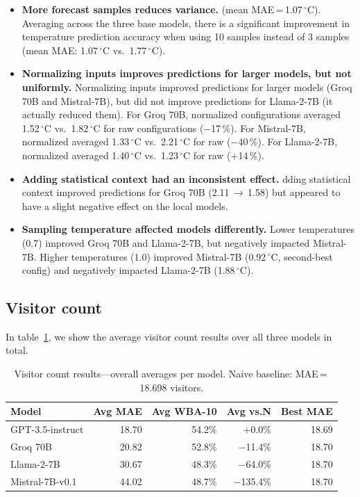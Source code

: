 \documentclass[11pt,a4paper]{article}
\begin{document}
\begin{itemize}[leftmargin=*]
\item \textbf{More forecast samples reduces variance.} (mean MAE\,=\,1.07\,$^{\circ}$C). Averaging across the three base models, there is a significant improvement in temperature prediction accuracy when using 10 samples instead of 3 samples (mean MAE: 1.07\,$^{\circ}$C vs.\ 1.77\,$^{\circ}$C).

\item \textbf{Normalizing inputs improves predictions for larger models, but not uniformly.} Normalizing inputs improved predictions for larger models (Groq 70B and Mistral-7B), but did not improve predictions for Llama-2-7B (it actually reduced them). 
  For Groq 70B, normalized configurations averaged 1.52\,$^{\circ}$C vs.\ 1.82\,$^{\circ}$C for raw configurations ($-$17\,\%).
  For Mistral-7B, normalized averaged 1.33\,$^{\circ}$C vs.\ 2.21\,$^{\circ}$C for raw ($-$40\,\%).
  For Llama-2-7B, normalized averaged 1.40\,$^{\circ}$C vs.\ 1.23\,$^{\circ}$C for raw ($+$14\,\%).  
  
\item \textbf{Adding statistical context had an inconsistent effect.}
  dding statistical context improved predictions for Groq 70B (2.11\,$\to$\,1.58) but appeared to have a slight negative effect on the local models.

\item \textbf{Sampling temperature affected models differently.}
  Lower temperatures (0.7) improved Groq 70B and Llama-2-7B, but negatively impacted Mistral-7B. Higher temperatures (1.0) improved Mistral-7B (0.92\,$^{\circ}$C, second-best config) and negatively impacted Llama-2-7B (1.88\,$^{\circ}$C).

\end{itemize}


\subsection{Visitor count}

In table~\ref{tab:vis_overall}, we show the average visitor count results over all three models in total.

\begin{table}[H]
\centering
\caption{Visitor count results---overall averages per model. Naive baseline: MAE\,=\,18.698 visitors.}
\label{tab:vis_overall}
\small
\begin{tabular}{l rrrr}
\toprule
Model & Avg MAE & Avg WBA-10 & Avg vs.N & Best MAE \\
\midrule
GPT-3.5-instruct & 18.70 & 54.2\% & $+$0.0\% & 18.69 \\
Groq 70B         & 20.82 & 52.8\% & $-$11.4\% & 18.70 \\
Llama-2-7B       & 30.67 & 48.3\% & $-$64.0\% & 18.70 \\
Mistral-7B-v0.1  & 44.02 & 48.7\% & $-$135.4\% & 18.70 \\
\bottomrule
\end{tabular}
\end{table}
\end{document}
